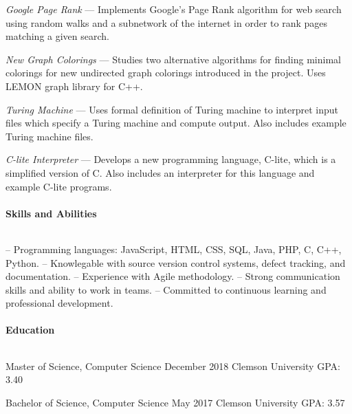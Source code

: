 \documentclass{article}
\begin{document}
  \hangindent=0.5in
  \textit{Google Page Rank} --- Implements Google's Page Rank algorithm
  for web search using random walks and a subnetwork of the internet in order to
  rank pages matching a given search.

  \hangindent=0.5in
	\textit{New Graph Colorings} --- Studies two alternative algorithms for
  finding minimal colorings for new undirected graph colorings introduced in the project. Uses LEMON
  graph library for C++.

  \hangindent=0.5in
	\textit{Turing Machine} --- Uses formal definition of Turing machine to
  interpret input files which specify a Turing machine and compute output. Also includes
  example Turing machine files.

  \hangindent=0.5in
	\textit{C-lite Interpreter} --- Develops a new programming language, C-lite, which
  is a simplified version of C. Also includes an interpreter for this language and
  example C-lite programs.

  \setlength{\parskip}{0.0in}
  \paragraph{Skills and Abilities} $ $
  \setlength{\parskip}{0.1in}

  \hangindent=0.4in
  -- Programming languages: JavaScript, HTML, CSS, SQL, Java, PHP, C, C++, Python. \newline
  -- Knowlegable with source version control systems, defect tracking, and documentation. \newline
  -- Experience with Agile methodology. \newline
  -- Strong communication skills and ability to work in teams. \newline
  -- Committed to continuous learning and professional development.

  \setlength{\parskip}{0.0in}
  \paragraph{Education} $ $
  \setlength{\parskip}{0.1in}

  \hangindent=0.8in
  Master of Science, Computer Science \hfill December 2018 \newline
  Clemson University \newline
  GPA: 3.40

  \hangindent=0.8in
  Bachelor of Science, Computer Science \hfill May 2017 \newline
  Clemson University \newline
  GPA: 3.57
\end{document}
